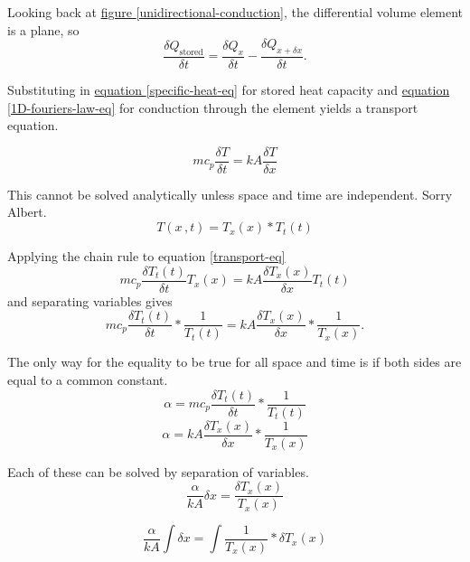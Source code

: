 \documentclass[10pt, twocolumn]{article}
\begin{document}
Looking back at
\hyperref[unidirectional-conduction]{figure \ref{unidirectional-conduction}},
the differential volume element is a plane, so
\begin{equation*}
\frac{\delta Q_{\textrm{stored}}}{\delta t}=
\frac{\delta Q_{x}}{\delta t}-
\frac{\delta Q_{x+\delta x}}{\delta t}.
\end{equation*}

Substituting in
\hyperref[heat-capacity-eq]{equation \ref{specific-heat-eq}}
for stored heat capacity and
\hyperref[1D-fouriers-law-eq]{equation \ref{1D-fouriers-law-eq}} for
conduction through the element yields a transport equation.

\begin{equation}
mc_{p}\frac{\delta T}{\delta t}=kA\frac{\delta T}{\delta x}
\label{transport-eq}
\end{equation}

This cannot be solved analytically unless space and time are independent.
Sorry Albert.
\begin{equation}
T(x\,,t)=T_{x}(x)*T_{t}(t)
\end{equation}

Applying the chain rule to equation \ref{transport-eq}
\begin{equation*}
mc_{p}\frac{\delta T_{t}(t)}{\delta t}T_{x}(x)=
kA\frac{\delta T_{x}(x)}{\delta x}T_{t}(t)
\end{equation*}
and separating variables gives
\begin{equation*}
mc_{p}\frac{\delta T_{t}(t)}{\delta t}*\frac{1}{T_{t}(t)}=
kA\frac{\delta T_{x}(x)}{\delta x}*\frac{1}{T_{x}(x)}.
\end{equation*}

The only way for the equality to be true for all space and time
is if both sides are equal to a common constant.
\begin{equation*}
\alpha=mc_{p}\frac{\delta T_{t}(t)}{\delta t}*\frac{1}{T_{t}(t)}
\end{equation*}
\begin{equation*}
\alpha=kA\frac{\delta T_{x}(x)}{\delta x}*\frac{1}{T_{x}(x)}
\end{equation*}

Each of these can be solved by separation of variables.
\begin{equation*}
\frac{\alpha}{kA}\delta x=\frac{\delta T_{x}(x)}{T_{x}(x)}
\end{equation*}

\begin{equation*}
\frac{\alpha}{kA}\int \delta x=\int \frac{1}{T_{x}(x)}*\delta T_{x}(x)
\end{equation*}
\end{document}
